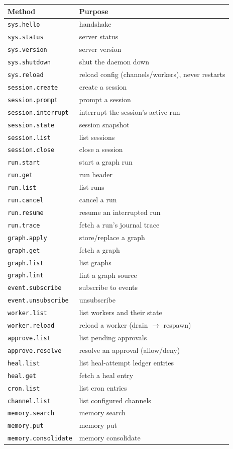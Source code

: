 \documentclass[
	fontsize=10pt,
	twoside=false,
	secnumdepth=2,
	open=any,
]{kaobook}
\begin{document}
\begin{longtable}{@{}ll@{}}
\toprule
\textbf{Method} & \textbf{Purpose} \\
\midrule
\endhead
\texttt{sys.hello} & handshake \\
\texttt{sys.status} & server status \\
\texttt{sys.version} & server version \\
\texttt{sys.shutdown} & shut the daemon down \\
\texttt{sys.reload} & reload config (channels/workers), never restarts \\
\texttt{session.create} & create a session \\
\texttt{session.prompt} & prompt a session \\
\texttt{session.interrupt} & interrupt the session's active run \\
\texttt{session.state} & session snapshot \\
\texttt{session.list} & list sessions \\
\texttt{session.close} & close a session \\
\texttt{run.start} & start a graph run \\
\texttt{run.get} & run header \\
\texttt{run.list} & list runs \\
\texttt{run.cancel} & cancel a run \\
\texttt{run.resume} & resume an interrupted run \\
\texttt{run.trace} & fetch a run's journal trace \\
\texttt{graph.apply} & store/replace a graph \\
\texttt{graph.get} & fetch a graph \\
\texttt{graph.list} & list graphs \\
\texttt{graph.lint} & lint a graph source \\
\texttt{event.subscribe} & subscribe to events \\
\texttt{event.unsubscribe} & unsubscribe \\
\texttt{worker.list} & list workers and their state \\
\texttt{worker.reload} & reload a worker (drain $\rightarrow$ respawn) \\
\texttt{approve.list} & list pending approvals \\
\texttt{approve.resolve} & resolve an approval (allow/deny) \\
\texttt{heal.list} & list heal-attempt ledger entries \\
\texttt{heal.get} & fetch a heal entry \\
\texttt{cron.list} & list cron entries \\
\texttt{channel.list} & list configured channels \\
\texttt{memory.search} & memory search \\
\texttt{memory.put} & memory put \\
\texttt{memory.consolidate} & memory consolidate \\
\bottomrule
\end{longtable}
\end{document}
